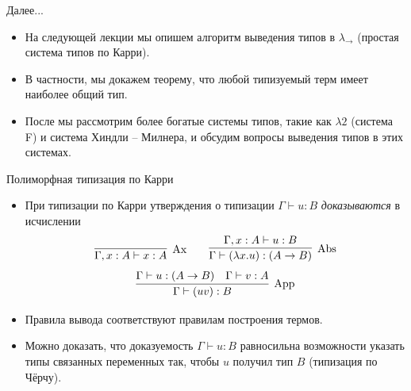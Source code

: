 \documentclass[xcolor=dvipsnames]{beamer}
\begin{document}
\begin{frame}{Далее...}

\begin{itemize}[<+->]
 \item На следующей лекции мы опишем алгоритм выведения типов в $\lambda_\to$ (простая система типов по Карри).
 \item В частности, мы докажем теорему, что любой типизуемый терм имеет наиболее общий тип.
 \item После мы рассмотрим более богатые системы типов, такие как $\lambda2$ (система F) и система Хиндли -- Милнера, и обсудим вопросы выведения типов в этих системах.
\end{itemize}

 
\end{frame}


\begin{frame}{Полиморфная типизация по Карри}


\begin{itemize}[<+->]
 \item При типизации по Карри утверждения о типизации $\Gamma \vdash u : B$ {\em доказываются} в исчислении
 \[
  \infer[\mathrm{Ax}]
  {\Gamma, x : A \vdash x : A}{}
  \qquad
  \infer[\mathrm{Abs}]
  {\Gamma \vdash
  (\lambda x . u) : (A \to B)}
  {\Gamma, x : A \vdash u : B}
 \]
 \[
  \infer[\mathrm{App}]
  {\Gamma \vdash (uv) : B}
  {\Gamma \vdash u : 
  (A \to B) & 
  \Gamma \vdash v : A}
 \]
 \item Правила вывода соответствуют правилам построения термов.
 \item Можно доказать, что доказуемость $\Gamma \vdash u: B$ равносильна возможности указать типы связанных переменных так, чтобы $u$ получил тип $B$ (типизация по Чёрчу).
\end{itemize}
 
\end{frame}
\end{document}
